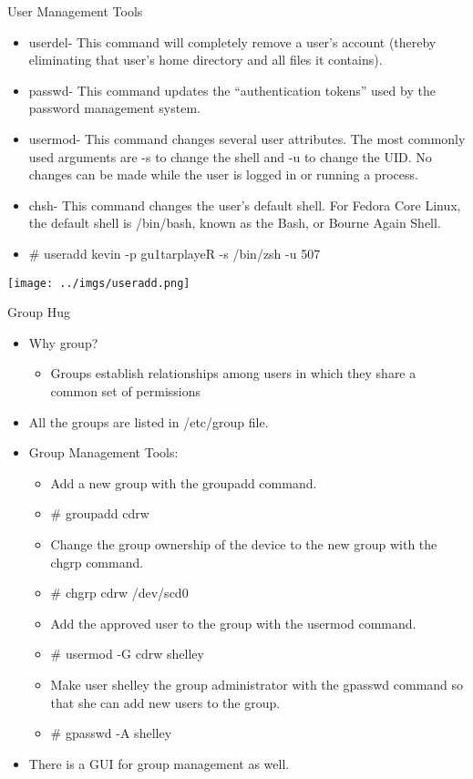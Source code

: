 \documentclass{beamer}
\begin{document}
\begin{frame}{User Management Tools }
\begin{itemize}
\item userdel- This command will completely remove a user's account (thereby eliminating that user's home directory and all files it contains).
\item passwd- This command updates the ``authentication tokens'' used by the password management system.
\item usermod- This command changes several user attributes. The most commonly used arguments are -s to change the shell and -u to change the UID. No changes can be made while the user is logged in or running a process.
\item chsh- This command changes the user's default shell. For Fedora Core Linux, the default shell is /bin/bash, known as the Bash, or Bourne Again Shell.
\end{itemize}
\end{frame}

\begin{frame}{}
\begin{itemize}
\item \# useradd kevin -p gu1tarplayeR -s /bin/zsh -u 507
\end{itemize}
\texttt{[image: ../imgs/useradd.png]}
\end{frame}

\begin{frame}{Group Hug}
\begin{itemize}
\item Why group?
\begin{itemize}
\item Groups establish relationships among users in which they share a common set of permissions
\end{itemize}
\item All the groups are listed in /etc/group file.
\item Group Management Tools:
\begin{itemize}
\item Add a new group with the groupadd command.
\item \# groupadd cdrw
\item Change the group ownership of the device to the new group with the chgrp command.
\item \# chgrp cdrw /dev/scd0
\item Add the approved user to the group with the usermod command.
\item \# usermod -G cdrw  shelley
\item Make user shelley the group administrator with the gpasswd command so that she can add new users to the group.
\item \# gpasswd -A shelley
\end{itemize}
\item There is a GUI for group management as well.
\end{itemize}
\end{frame}
\end{document}
